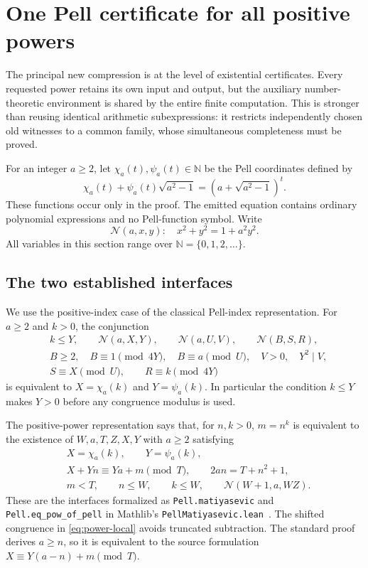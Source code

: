 \section{One Pell certificate for all positive powers}
\label{sec:batched-powers}

The principal new compression is at the level of existential certificates.
Every requested power retains its own input and output, but the auxiliary
number-theoretic environment is shared by the entire finite computation.
This is stronger than reusing identical arithmetic subexpressions: it
restricts independently chosen old witnesses to a common family, whose
simultaneous completeness must be proved.

For an integer $a\geq2$, let $\chi_a(t),\psi_a(t)\in\mathbb N$ be the Pell
coordinates defined by
\[
 \chi_a(t)+\psi_a(t)\sqrt{a^2-1}
       =(a+\sqrt{a^2-1})^t.
\]
These functions occur only in the proof. The emitted equation contains
ordinary polynomial expressions and no Pell-function symbol. Write
\[
 \mathcal N(a,x,y):\quad x^2+y^2=1+a^2y^2.
\]
All variables in this section range over $\mathbb N=\{0,1,2,\ldots\}$.

\subsection{The two established interfaces}

We use the positive-index case of the classical Pell-index representation.
For $a\geq2$ and $k>0$, the conjunction
\begin{align}
 &k\leq Y,\qquad \mathcal N(a,X,Y),\qquad
   \mathcal N(a,U,V),\qquad \mathcal N(B,S,R),\label{eq:index-norms}\\
 &B\geq2,\quad B\equiv1\pmod{4Y},\quad B\equiv a\pmod U,
   \quad V>0,\quad Y^2\mid V,\label{eq:index-frame}\\
 &S\equiv X\pmod U,\qquad R\equiv k\pmod{4Y}
 \label{eq:index-congruences}
\end{align}
is equivalent to $X=\chi_a(k)$ and $Y=\psi_a(k)$. In particular the
condition $k\leq Y$ makes $Y>0$ before any congruence modulus is used.

The positive-power representation says that, for $n,k>0$, $m=n^k$ is
equivalent to the existence of $W,a,T,Z,X,Y$ with $a\geq2$ satisfying
\begin{align}
 &X=\chi_a(k),\qquad Y=\psi_a(k),\label{eq:power-pell}\\
 &X+Yn\equiv Ya+m\pmod T,\qquad 2an=T+n^2+1,\label{eq:power-local}\\
 &m<T,\qquad n\leq W,\qquad k\leq W,
   \qquad \mathcal N(W+1,a,WZ).\label{eq:power-global}
\end{align}
These are the interfaces formalized as \texttt{Pell.matiyasevic} and
\texttt{Pell.eq\_pow\_of\_pell} in Mathlib's
\texttt{PellMatiyasevic.lean}~\cite{pell}. The shifted congruence in
\eqref{eq:power-local} avoids truncated subtraction. The standard proof
derives $a\geq n$, so it is equivalent to the source formulation
$X\equiv Y(a-n)+m\pmod T$.

